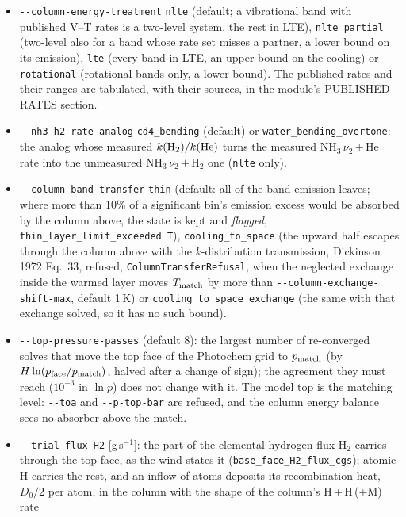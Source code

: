 \documentclass[english,a4paper]{my_memo}
\begin{document}
\begin{itemize}\itemsep1pt
\item \texttt{-{}-column-energy-treatment} \texttt{nlte} (default; a
  vibrational band with published V--T rates is a two-level system, the rest
  in LTE), \texttt{nlte\_partial} (two-level also for a band whose rate set
  misses a partner, a lower bound on its emission), \texttt{lte} (every band
  in LTE, an upper bound on the cooling) or \texttt{rotational} (rotational
  bands only, a lower bound). The published rates and their ranges are
  tabulated, with their sources, in the module's PUBLISHED RATES section.
\item \texttt{-{}-nh3-h2-rate-analog} \texttt{cd4\_bending} (default) or
  \texttt{water\_bending\_overtone}: the analog whose measured
  $k({\rm H_2})/k({\rm He})$ turns the measured NH$_3$\,$\nu_2$\,$+$\,He
  rate into the unmeasured NH$_3$\,$\nu_2$\,$+$\,H$_2$ one (\texttt{nlte}
  only).
\item \texttt{-{}-column-band-transfer} \texttt{thin} (default: all of the
  band emission leaves; where more than 10\% of a significant bin's emission
  excess would be absorbed by the column above, the state is kept and
  \emph{flagged}, \texttt{thin\_layer\_limit\_exceeded T}),
  \texttt{cooling\_to\_space} (the upward half escapes through the column
  above with the $k$-distribution transmission, Dickinson 1972 Eq.~33,
  refused, \texttt{ColumnTransferRefusal}, when the neglected exchange inside
  the warmed layer moves $T_{\rm match}$ by more than
  \texttt{-{}-column-exchange-shift-max}, default 1\,K) or
  \texttt{cooling\_to\_space\_exchange} (the same with that exchange solved,
  so it has no such bound).
\item \texttt{-{}-top-pressure-passes} (default 8): the largest number of
  re-converged solves that move the top face of the Photochem grid to
  $p_{\rm match}$ (by $H\ln(p_{\rm face}/p_{\rm match})$, halved after a
  change of sign); the agreement they must reach ($10^{-3}$ in $\ln p$) does
  not change with it. The model top is the matching level:
  \texttt{-{}-toa} and \texttt{-{}-p-top-bar} are refused, and the column
  energy balance sees no absorber above the match.
\item \texttt{-{}-trial-flux-H2} [g\,s$^{-1}$]: the part of the elemental
  hydrogen flux H$_2$ carries through the top face, as the wind states it
  (\texttt{base\_face\_H2\_flux\_cgs}); atomic H carries the rest, and an
  inflow of atoms deposits its recombination heat, $D_0/2$ per atom, in the
  column with the shape of the column's H\,+\,H\,(+M) rate

\end{itemize}
\end{document}
